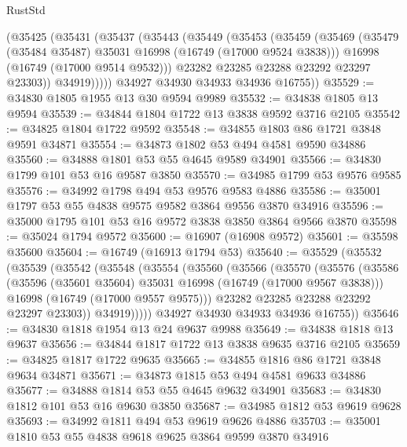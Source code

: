 \begin{lexlean}{RustStd}
\begin{coremodule}
        (@35425
          (@35431
            (@35437
              (@35443
                (@35449
                  (@35453
                    (@35459
                      (@35469
                        (@35479 (@35484 @35487) @35031 @16998 (@16749 (@17000 @9524 @3838)))
                        @16998
                        (@16749 (@17000 @9514 @9532)))
                      @23282
                      @23285
                      @23288
                      @23292
                      @23297
                      @23303))
                  @34919)))))
        @34927
        @34930
        @34933
        @34936
        @16755))
@35529 := @34830 @1805 @1955 @13 @30 @9594 @9989
@35532 := @34838 @1805 @13 @9594
@35539 := @34844 @1804 @1722 @13 @3838 @9592 @3716 @2105
@35542 := @34825 @1804 @1722 @9592
@35548 := @34855 @1803 @86 @1721 @3848 @9591 @34871
@35554 := @34873 @1802 @53 @494 @4581 @9590 @34886
@35560 := @34888 @1801 @53 @55 @4645 @9589 @34901
@35566 := @34830 @1799 @101 @53 @16 @9587 @3850
@35570 := @34985 @1799 @53 @9576 @9585
@35576 := @34992 @1798 @494 @53 @9576 @9583 @4886
@35586 := @35001 @1797 @53 @55 @4838 @9575 @9582 @3864 @9556 @3870 @34916
@35596 := @35000 @1795 @101 @53 @16 @9572 @3838 @3850 @3864 @9566 @3870
@35598 := @35024 @1794 @9572
@35600 := @16907 (@16908 @9572)
@35601 := @35598 @35600
@35604 := @16749 (@16913 @1794 @53)
@35640 := @35529
    (@35532
      (@35539
        (@35542
          (@35548
            (@35554
              (@35560
                (@35566
                  (@35570
                    (@35576
                      (@35586
                        (@35596 (@35601 @35604) @35031 @16998 (@16749 (@17000 @9567 @3838)))
                        @16998
                        (@16749 (@17000 @9557 @9575)))
                      @23282
                      @23285
                      @23288
                      @23292
                      @23297
                      @23303))
                  @34919)))))
        @34927
        @34930
        @34933
        @34936
        @16755))
@35646 := @34830 @1818 @1954 @13 @24 @9637 @9988
@35649 := @34838 @1818 @13 @9637
@35656 := @34844 @1817 @1722 @13 @3838 @9635 @3716 @2105
@35659 := @34825 @1817 @1722 @9635
@35665 := @34855 @1816 @86 @1721 @3848 @9634 @34871
@35671 := @34873 @1815 @53 @494 @4581 @9633 @34886
@35677 := @34888 @1814 @53 @55 @4645 @9632 @34901
@35683 := @34830 @1812 @101 @53 @16 @9630 @3850
@35687 := @34985 @1812 @53 @9619 @9628
@35693 := @34992 @1811 @494 @53 @9619 @9626 @4886
@35703 := @35001 @1810 @53 @55 @4838 @9618 @9625 @3864 @9599 @3870 @34916

\end{coremodule}
\end{lexlean}
